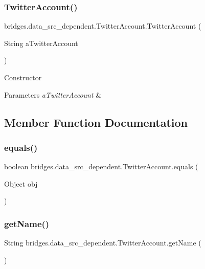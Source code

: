 \subsubsection{\texorpdfstring{TwitterAccount()}{TwitterAccount()}}
{\footnotesize\ttfamily bridges.\+data\+\_\+src\+\_\+dependent.\+Twitter\+Account.\+Twitter\+Account (\begin{DoxyParamCaption}\item[{String}]{a\+Twitter\+Account }\end{DoxyParamCaption})}

Constructor 
\begin{DoxyParams}{Parameters}
{\em a\+Twitter\+Account} & \\
\hline
\end{DoxyParams}


\subsection{Member Function Documentation}
\mbox{\label{classbridges_1_1data__src__dependent_1_1_twitter_account_a2bddc8fe99b9096fe90968d805fa91e1}} 
\subsubsection{\texorpdfstring{equals()}{equals()}}
{\footnotesize\ttfamily boolean bridges.\+data\+\_\+src\+\_\+dependent.\+Twitter\+Account.\+equals (\begin{DoxyParamCaption}\item[{Object}]{obj }\end{DoxyParamCaption})}

\mbox{\label{classbridges_1_1data__src__dependent_1_1_twitter_account_a92c536bd6a65c51d84a77d772775e20c}} 
\subsubsection{\texorpdfstring{getName()}{getName()}}
{\footnotesize\ttfamily String bridges.\+data\+\_\+src\+\_\+dependent.\+Twitter\+Account.\+get\+Name (\begin{DoxyParamCaption}{ }\end{DoxyParamCaption})}

